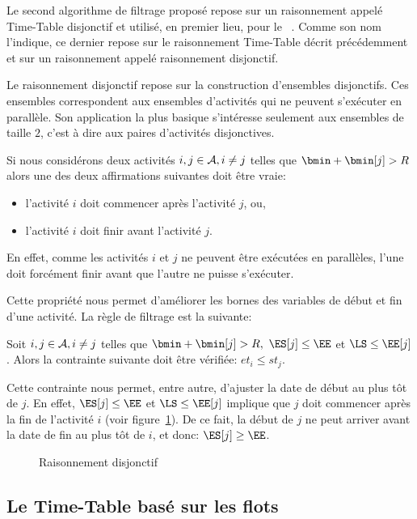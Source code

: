 Le second algorithme de filtrage proposé repose sur un raisonnement
appelé Time-Table disjonctif et utilisé, en premier lieu, pour le
\CUSP~\cite{Gay2015}. Comme son nom l'indique, ce dernier repose sur
le raisonnement Time-Table décrit précédemment et sur un raisonnement
appelé raisonnement disjonctif. 

Le raisonnement disjonctif repose sur la construction d'ensembles
disjonctifs. Ces ensembles correspondent aux ensembles d'activités qui
ne peuvent s'exécuter en parallèle. Son application la plus basique
s'intéresse seulement aux ensembles de taille $2$, c'est à dire aux
paires d'activités disjonctives. 

Si nous considérons deux activités $i, j \in {\cal A}, i\neq j$ telles que
$\bmin + \bmin[j] > R$ alors une des deux affirmations suivantes doit
être vraie:
\begin{itemize}
\item l'activité $i$ doit commencer après l'activité $j$, ou, 
\item l'activité $i$ doit finir avant l'activité $j$.  
\end{itemize}
En effet, comme les activités $i$ et $j$ ne peuvent être exécutées en
parallèles, l'une doit forcément finir avant que l'autre ne puisse
s'exécuter. 

Cette propriété nous permet d'améliorer les bornes des variables de
début et fin d'une activité. La règle de filtrage est la suivante:

\begin{prop}
Soit $i,j \in {\cal A}, i\neq j$ telles que $\bmin + \bmin[j] > R,\ \ES[j] \le
\EE$ et $\LS \le \EE[j]$. Alors la contrainte suivante doit être vérifiée: $et_i\le st_j$. 
\end{prop}

Cette contrainte nous permet, entre autre, d'ajuster la date de début
au plus tôt de $j$. En effet, $\ES[j] \le
\EE$ et $\LS \le \EE[j]$ implique que $j$ doit commencer après la fin
de l'activité $i$ (voir figure~\ref{fig_disj}). De ce fait, la début
de $j$ ne peut arriver avant la date de fin au plus tôt de $i$, et
donc: $\ES[j] \ge \EE$.

\begin{figure}[!htb]
  \centering 
  \caption{Raisonnement disjonctif}
  \label{fig_disj}
\end{figure}

\subsection{Le Time-Table basé sur les flots}


